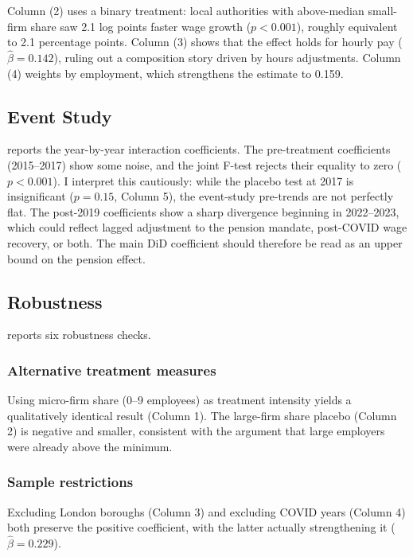 \documentclass[12pt]{article}
\begin{document}
Column (2) uses a binary treatment: local authorities with above-median small-firm share saw 2.1 log points faster wage growth ($p < 0.001$), roughly equivalent to 2.1 percentage points. Column (3) shows that the effect holds for hourly pay ($\hat{\beta} = 0.142$), ruling out a composition story driven by hours adjustments. Column (4) weights by employment, which strengthens the estimate to 0.159.



\subsection{Event Study}

 reports the year-by-year interaction coefficients. The pre-treatment coefficients (2015--2017) show some noise, and the joint F-test rejects their equality to zero ($p < 0.001$). I interpret this cautiously: while the placebo test at 2017 is insignificant ($p = 0.15$,  Column 5), the event-study pre-trends are not perfectly flat. The post-2019 coefficients show a sharp divergence beginning in 2022--2023, which could reflect lagged adjustment to the pension mandate, post-COVID wage recovery, or both. The main DiD coefficient should therefore be read as an upper bound on the pension effect.



\subsection{Robustness}

 reports six robustness checks.

\subsubsection*{Alternative treatment measures} Using micro-firm share (0--9 employees) as treatment intensity yields a qualitatively identical result (Column 1). The large-firm share placebo (Column 2) is negative and smaller, consistent with the argument that large employers were already above the minimum.

\subsubsection*{Sample restrictions} Excluding London boroughs (Column 3) and excluding COVID years (Column 4) both preserve the positive coefficient, with the latter actually strengthening it ($\hat{\beta} = 0.229$).
\end{document}
